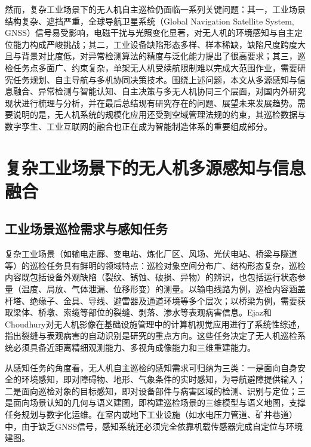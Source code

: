 然而，复杂工业场景下的无人机自主巡检仍面临一系列关键问题：其一，工业场景结构复杂、遮挡严重，全球导航卫星系统（Global Navigation Satellite System, GNSS）信号易受影响，电磁干扰与光照变化显著，对无人机的环境感知与自主定位能力构成严峻挑战\cite{scaramuzza2014vision,stoecker2017review}；其二，工业设备缺陷形态多样、样本稀缺，缺陷尺度跨度大且与背景对比度低，对异常检测算法的精度与泛化能力提出了很高要求\cite{taox2021survey,nguyen2018automatic}；其三，巡检任务点多面广、约束复杂，单架无人机受续航限制难以完成大范围作业，需要研究任务规划、自主导航与多机协同决策技术\cite{zeng2016wireless,mozaffari2019tutorial,zhang2019energy}。围绕上述问题，本文从多源感知与信息融合、异常检测与智能认知、自主决策与多无人机协同三个层面，对国内外研究现状进行梳理与分析，并在最后总结现有研究存在的问题、展望未来发展趋势。需要说明的是，无人机系统的规模化应用还受到空域管理法规的约束\cite{stoecker2017review}，其巡检数据与数字孪生、工业互联网的融合也正在成为智能制造体系的重要组成部分\cite{tao2019digital}。

\section{复杂工业场景下的无人机多源感知与信息融合}

\subsection{工业场景巡检需求与感知任务}

复杂工业场景（如输电走廊、变电站、炼化厂区、风场、光伏电站、桥梁与隧道等）的巡检任务具有鲜明的领域特点：巡检对象空间分布广、结构形态复杂，巡检内容既包括设备外观缺陷（裂纹、锈蚀、破损、异物）的辨识，也包括运行状态参量（温度、局放、气体泄漏、位移形变）的测量\cite{nguyen2018automatic,miao2020uav,zhouwq2024review}。以输电线路为例，巡检内容涵盖杆塔、绝缘子、金具、导线、避雷器及通道环境等多个层次\cite{deng2014unmanned,miao2020uav}；以桥梁为例，需要获取梁体、桥墩、索缆等部位的裂缝、剥落、渗水等表观病害信息\cite{morgenthal2014quality,ham2016visual,dorafshan2018bridge,liu2020image}。Ejaz和Choudhury\cite{ejaz2024drone}对无人机影像在基础设施管理中的计算机视觉应用进行了系统性综述，指出裂缝与表观病害的自动识别是研究的重点方向。这些任务决定了无人机巡检系统必须具备近距离精细观测能力、多视角成像能力和三维重建能力\cite{colomina2014unmanned,nex2014uav,spencer2019advances}。

从感知任务的角度看，无人机自主巡检的感知需求可归纳为三类：一是面向自身安全的环境感知，即对障碍物、地形、气象条件的实时感知，为导航避障提供输入\cite{kanellakis2017survey,lvyang2019sense}；二是面向巡检对象的目标感知，即对设备部件与病害区域的检测、识别与定位\cite{yeum2015vision,cha2017deep}；三是面向场景认知的几何与语义建图，即构建巡检场景的三维模型与语义地图，支撑任务规划与数字化运维\cite{nex2014uav,ham2016visual,tao2019digital}。在室内或地下工业设施（如水电压力管道、矿井巷道）中，由于缺乏GNSS信号，感知系统还必须完全依靠机载传感器完成自定位与环境建图\cite{ozaslan2017autonomous,petrlik2020robust,nil2012review}。

